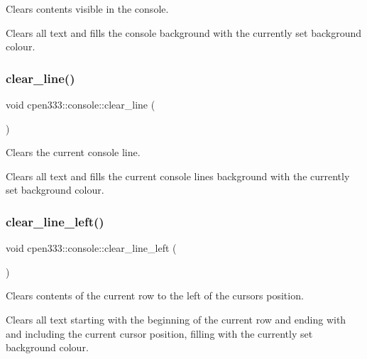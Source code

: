 Clears contents visible in the console. 

Clears all text and fills the console background with the currently set background colour. \mbox{\label{classcpen333_1_1console_a34df62ef953db9403e25c10827decc4c}} 
\subsubsection{\texorpdfstring{clear\+\_\+line()}{clear\_line()}}
{\footnotesize\ttfamily void cpen333\+::console\+::clear\+\_\+line (\begin{DoxyParamCaption}{ }\end{DoxyParamCaption})\hspace{0.3cm}{\ttfamily [inline]}}



Clears the current console line. 

Clears all text and fills the current console line\textquotesingle{}s background with the currently set background colour. \mbox{\label{classcpen333_1_1console_a66197024600f995776ce5d8428f6b3d1}} 
\subsubsection{\texorpdfstring{clear\+\_\+line\+\_\+left()}{clear\_line\_left()}}
{\footnotesize\ttfamily void cpen333\+::console\+::clear\+\_\+line\+\_\+left (\begin{DoxyParamCaption}{ }\end{DoxyParamCaption})\hspace{0.3cm}{\ttfamily [inline]}}



Clears contents of the current row to the left of the cursor\textquotesingle{}s position. 

Clears all text starting with the beginning of the current row and ending with and including the current cursor position, filling with the currently set background colour. \mbox{\label{classcpen333_1_1console_a36a1cf0fec4bab91d147e294f338c373}} 
